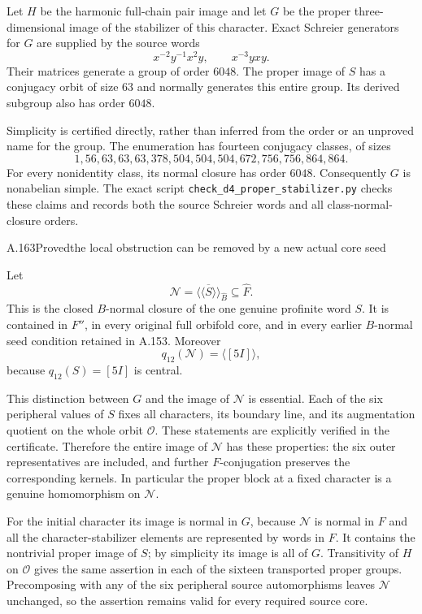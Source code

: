 Let $H$ be the harmonic full-chain pair image and let
$G$ be the proper three-dimensional image of the
stabilizer of this character.  Exact Schreier generators
for $G$ are supplied by the source words
\[
              x^{-2}y^{-1}x^2y,
              \qquad x^{-3}yxy.
\]
Their matrices generate a group of order $6048$.
The proper image of $S$ has a conjugacy orbit of size
$63$ and normally generates this entire group.
Its derived subgroup also has order $6048$.

Simplicity is certified directly, rather than inferred
from the order or an unproved name for the group.
The enumeration has fourteen conjugacy classes, of sizes
\[
 1,56,63,63,63,378,504,504,504,672,756,756,864,864.
\]
For every nonidentity class, its normal closure has
order $6048$.  Consequently $G$ is nonabelian simple.
The exact script
\texttt{check\_d4\_proper\_stabilizer.py} checks these
claims and records both the source Schreier words and
all class-normal-closure orders.

\begin{statement}{A.163}{Proved}{the local obstruction can be removed by a new actual core seed}
\end{statement}
Let
\[
            \mathcal N=\overline{\langle\!\langle S
                         \rangle\!\rangle}_{\widehat B}
                         \subseteq\widehat F.
\]
This is the closed $B$-normal closure of the one genuine
profinite word $S$.  It is contained in $F''$, in every
original full orbifold core, and in every earlier
$B$-normal seed condition retained in A.153.  Moreover
\[
                     q_{12}(\mathcal N)=\langle[5I]\rangle,
\]
because $q_{12}(S)=[5I]$ is central.

This distinction between $G$ and the image of
$\mathcal N$ is essential.  Each of the six peripheral
values of $S$ fixes all characters, its boundary line,
and its augmentation quotient on the whole orbit
$\mathcal O$.  These statements are explicitly
verified in the certificate.  Therefore the entire
image of $\mathcal N$ has these properties: the six
outer representatives are included, and further
$F$-conjugation preserves the corresponding kernels.
In particular the proper block at a fixed character
is a genuine homomorphism on $\mathcal N$.

For the initial character its image is normal in $G$,
because $\mathcal N$ is normal in $F$ and all the
character-stabilizer elements are represented by words
in $F$.  It contains the nontrivial proper image of $S$;
by simplicity its image is all of $G$.  Transitivity
of $H$ on $\mathcal O$ gives the same assertion in
each of the sixteen transported proper groups.
Precomposing with any of the six peripheral source
automorphisms leaves $\mathcal N$ unchanged, so the
assertion remains valid for every required source core.

